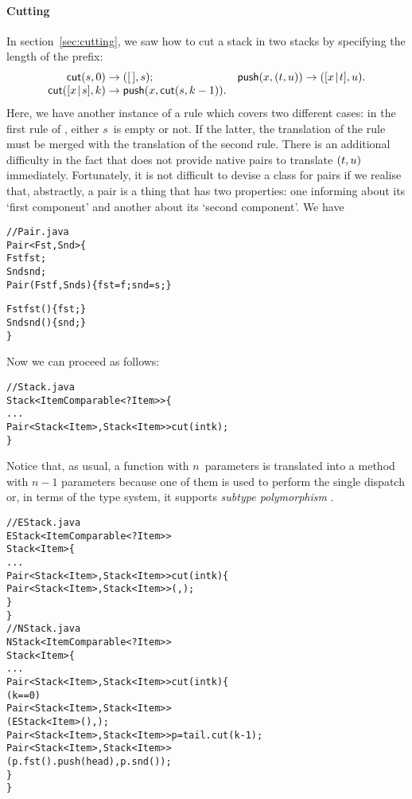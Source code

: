 \paragraph{Cutting}

In section~\vref{sec:cutting}, we saw how to cut a stack in two stacks
by specifying the length of the prefix:
\begin{equation*}
\begin{array}{@{}r@{\;}l@{\;}lr@{\;}l@{\;}l@{}}
\fun{cut}(s,0) & \rightarrow & \pair{\el}{s};
& \fun{push}(x,\pair{t}{u}) & \rightarrow & \pair{\cons{x}{t}}{u}.\\
\fun{cut}(\cons{x}{s},k) & \rightarrow
& \fun{push}(x,\fun{cut}(s,k-1)).
\end{array}
\end{equation*}
Here, we have another instance of a rule which covers two different
cases: in the first rule of , either \(s\)~is empty or
not. If the latter, the translation of the rule must be merged with
the translation of the second rule. There is an additional difficulty
in the fact that \Java does not provide native pairs to translate
\(({t},{u})\) immediately. Fortunately, it is not difficult to
devise a class for pairs if we realise that, abstractly, a pair is a
thing that has two properties: one informing about its `first
component' and another about its `second component'. We have
\begin{alltt}
// Pair.java
\public \class Pair<Fst,Snd> \{
  \protectedX \final Fst fst;
  \protectedX \final Snd snd;
  \public Pair(\final Fst f, \final Snd s) \{fst = f; snd = s;\}

  \public Fst fst() \{ \return fst; \}
  \public Snd snd() \{ \return snd; \}
\}
\end{alltt}
Now we can proceed as follows:
\begin{alltt}
// Stack.java
\public \abstractX
\class Stack<Item \extends Comparable<? \super Item>> \{
  ...
  \public \abstractX
  Pair<Stack<Item>,Stack<Item>> cut(\final int k);
\}
\end{alltt}
Notice that, as usual, a function with \(n\)~parameters is translated
into a method with \(n-1\) parameters because one of them is used to
perform the single dispatch or, in terms of the type system, it
supports \emph{subtype polymorphism} \citep{Pierce_2002}.
\begin{alltt}
// EStack.java
\public \class EStack<Item \extends Comparable<? \super Item>>
       \extends Stack<Item> \{
  ...
  \public Pair<Stack<Item>,Stack<Item>> cut(\final int k) \{
    \return \new Pair<Stack<Item>,Stack<Item>>(\this,\this);
  \}
\}
// NStack.java
\public \class NStack<Item \extends Comparable<? \super Item>>
       \extends Stack<Item> \{
  ...
  \public Pair<Stack<Item>,Stack<Item>> cut(\final int k) \{
    \ifX (k == 0)
       \return \new Pair<Stack<Item>,Stack<Item>>
                      (\new EStack<Item>(),\this);
    Pair<Stack<Item>,Stack<Item>> p = tail.cut(k-1);
    \return \new Pair<Stack<Item>,Stack<Item>>
                   (p.fst().push(head),p.snd());
  \}
\}
\end{alltt}
